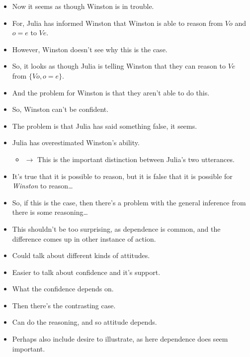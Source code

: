 \documentclass[10pt]{article}
\begin{document}
\begin{itemize}
\item Now it seems as though Winston is in trouble.
\item For, Julia has informed Winston that Winston is able to reason from \(Vo\) and \(o = e\) to \(Ve\).
\item However, Winston doesn't see why this is the case.
\item So, it looks as though Julia is telling Winston that they can reason to \(Ve\) from \(\{Vo, o = e\}\).
\item And the problem for Winston is that they aren't able to do this.
\item So, Winston can't be confident.
\item The problem is that Julia has said something false, it seems.
\item Julia has overestimated Winston's ability.
  \begin{itemize}
  \item \(\rightarrow\) This is the important distinction between Julia's two utterances.
  \end{itemize}
\item It's true that it is possible to reason, but it is false that it is possible for \emph{Winston} to reason\dots
\item So, if this is the case, then there's a problem with the general inference from there is some reasoning\dots
\item This shouldn't be too surprising, as dependence is common, and the difference comes up in other instance of action.
\end{itemize}

\begin{itemize}
\item Could talk about different kinds of attitudes.
\item Easier to talk about confidence and it's support.
\item What the confidence depends on.
\end{itemize}

\begin{itemize}
\item Then there's the contrasting case.
\item Can do the reasoning, and so attitude depends.
\item Perhaps also include desire to illustrate, as here dependence does seem important.
\end{itemize}
\end{document}
